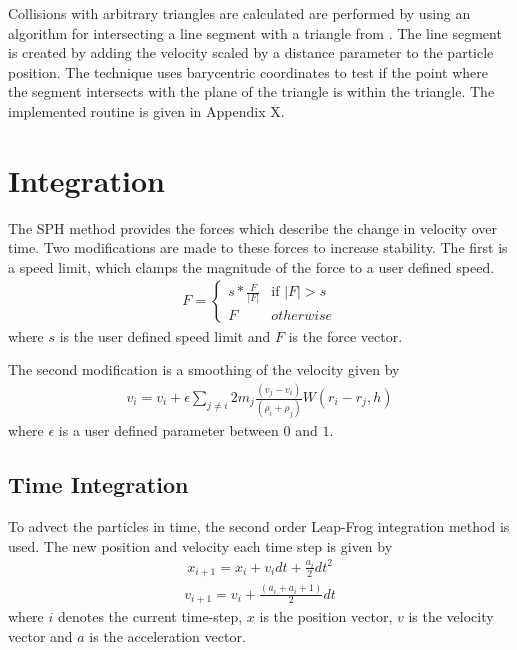 Collisions with arbitrary triangles are calculated are performed by using an
algorithm for intersecting a line segment with a triangle from \cite{Ericson}. The line segment is
created by adding the velocity scaled by a distance parameter to the particle
position. The technique uses barycentric coordinates to test if the point where
the segment intersects with the plane of the triangle is within the triangle.
The implemented routine is given in Appendix X.



\section{Integration}

The SPH method provides the forces which describe the change in velocity over
time. Two modifications are made to these forces to increase stability. The
first is a speed limit, which clamps the magnitude of the force to a user defined speed.
\begin{align}
F = \begin{cases} s * \frac{F}{|F|} & \text{if $|F| > s$}
    \\
    F & \text{$otherwise$}
\end{cases}
\end{align}
where $s$ is the user defined speed limit and $F$ is the force vector.

The second modification is a smoothing of the velocity given by
\begin{align}
v_i = v_i + \epsilon \sum_{j \ne i} 2m_j \frac{(v_j - v_i)}{(\rho_i + \rho_j)} W(r_i - r_j, h)
\end{align}
where $\epsilon$ is a user defined parameter between $0$ and $1$.

\subsection{Time Integration}
To advect the particles in time, the second order Leap-Frog integration method
is used. The new position and velocity each time step is given by
\begin{align}
x_{i+1} = x_i + v_i dt + \frac{a_i}{2} dt^2
\end{align}
\begin{align}
v_{i+1} = v_i + \frac{(a_i + a_i+1)}{2} dt
\end{align}
where $i$ denotes the current time-step, $x$ is the position vector, $v$ is the velocity vector and $a$ is the acceleration vector.

